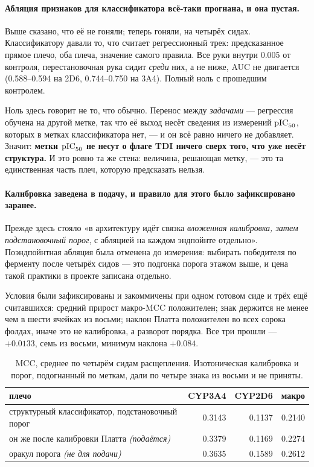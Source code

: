 \paragraph{Абляция признаков для классификатора всё-таки прогнана, и она пустая.} Выше сказано,
что её не гоняли; теперь гоняли, на четырёх сидах. Классификатору давали то, что считает
регрессионный трек: предсказанное прямое плечо, оба плеча, значение самого правила. Все руки
внутри 0.005 от контроля, перестановочная рука сидит \emph{среди} них, а не ниже, AUC не двигается
(0.588--0.594 на 2D6, 0.744--0.750 на 3A4). Полный ноль с прошедшим контролем.

Ноль здесь говорит не то, что обычно. Перенос между \emph{задачами} --- регрессия обучена на другой
метке, так что её выход несёт сведения из измерений $\mathrm{pIC}_{50}$, которых в метках классификатора нет, ---
и он всё равно ничего не добавляет. Значит: \textbf{метки $\mathrm{pIC}_{50}$ не несут о флаге TDI ничего сверх
того, что уже несёт структура.} И это ровно та же стена: величина, решающая метку, --- это та
единственная часть плеч, которую предсказать нельзя.

\paragraph{Калибровка заведена в подачу, и правило для этого было зафиксировано заранее.} Прежде
здесь стояло «в архитектуру идёт связка \emph{вложенная калибровка, затем подстановочный порог}, с
абляцией на каждом эндпойнте отдельно». Поэндпойнтная абляция была отменена до измерения: выбирать
победителя по ферменту после четырёх сидов --- это подгонка порога этажом выше, и цена такой
практики в проекте записана отдельно.

Условия были зафиксированы и закоммичены при одном готовом сиде и трёх ещё считавшихся: средний
прирост макро-MCC положителен; знак держится не менее чем в шести ячейках из восьми; наклон Платта
положителен во всех сорока фолдах, иначе это не калибровка, а разворот порядка. Все три прошли ---
$+0.0133$, семь из восьми, минимум наклона $+0.084$.

\begin{table}[htbp]\centering\small
\begin{tabularx}{0.9\textwidth}{@{}Xrrr@{}}
\toprule
плечо & CYP3A4 & CYP2D6 & макро \\
\midrule
структурный классификатор, подстановочный порог & 0.3143 & 0.1137 & 0.2140 \\
он же после калибровки Платта \emph{(подаётся)}  & 0.3379 & 0.1169 & 0.2274 \\
оракул порога \emph{(не для подачи)}             & 0.3635 & 0.1589 & 0.2612 \\
\bottomrule
\end{tabularx}
\caption{MCC, среднее по четырём сидам расщепления. Изотоническая калибровка и порог, подогнанный
по меткам, дали по четыре знака из восьми и не приняты.}
\label{tab:tdicalib}
\end{table}

